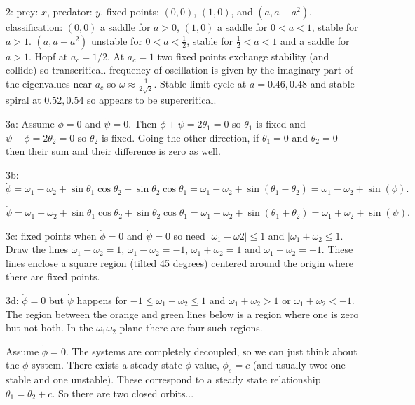 \documentclass[12pt,letterpaper,noanswers]{exam}
\begin{document}
2: prey: $x$, predator: $y$.  fixed points: $(0,0)$, $(1,0)$, and $(a,a-a^2)$.  classification: $(0,0)$ a saddle for $a>0$, $(1,0)$ a saddle for $0<a<1$, stable for $a>1$.  $(a,a-a^2)$ unstable for $0<a<\frac{1}{2}$, stable for $\frac{1}{2}<a<1$ and a saddle for $a>1$.  Hopf at $a_c = 1/2$.   At $a_c = 1$ two fixed points exchange stability (and collide) so transcritical.  frequency of oscillation is given by the imaginary part of the eigenvalues near $a_c$ so $\omega \approx \frac{1}{2\sqrt{2}}$. Stable limit cycle at $a = 0.46, 0.48$ and stable spiral at $0.52,0.54$ so appears to be supercritical.


3a: Assume $\dot \phi = 0$ and $\dot \psi = 0$.  Then $\dot \phi + \dot \psi = 2\dot \theta_1 = 0$ so $\theta_1$ is fixed and $\dot \psi - \dot\phi = 2\theta_2 = 0$ so $\theta_2$ is fixed.  Going the other direction, if $\dot\theta_1 = 0$ and $\dot\theta_2=0$ then their sum and their difference is zero as well.

3b: $\dot\phi = \omega_1 - \omega_2 + \sin\theta_1\cos\theta_2 - \sin\theta_2\cos\theta_1 = \omega_1-\omega_2 + \sin(\theta_1 - \theta_2) = \omega_1-\omega_2 + \sin(\phi).$

$\dot\psi = \omega_1 + \omega_2 + \sin\theta_1\cos\theta_2 + \sin\theta_2\cos\theta_1 = \omega_1+\omega_2 + \sin(\theta_1 + \theta_2) = \omega_1+\omega_2 + \sin(\psi).$

3c: fixed points when $\dot \phi = 0$ and $\dot\psi = 0$ so need $\vert\omega_1 - \omega 2\vert\leq 1$ and $\vert \omega_1+\omega_2 \leq 1$.  Draw the lines $\omega_1 -\omega_2 = 1$, $\omega_1-\omega_2 = -1$, $\omega_1+\omega_2 = 1$ and $\omega_1+\omega_2 =-1$.  These lines enclose a square region (tilted 45 degrees) centered around the origin where there are fixed points.

3d: $\dot\phi = 0$ but $\dot\psi$ happens for $-1\leq \omega_1 - \omega_2 \leq 1$ and $\omega_1+\omega_2 >1$ or $\omega_1+\omega_2 < -1$.  The region between the orange and green lines below is a region where one is zero but not both.  In the $\omega_1\omega_2$ plane there are four such regions.

Assume $\dot\phi = 0$. The systems are completely decoupled, so we can just think about the $\phi$ system.  There exists a steady state $\phi$ value, $\phi_s = c$ (and usually two: one stable and one unstable).  These correspond to a steady state relationship $\theta_1 = \theta_2 + c$.  So there are two closed orbits...
\end{document}
